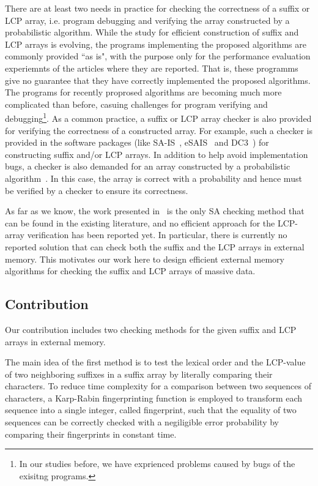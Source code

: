 \documentclass[10pt,journal,compsoc]{IEEEtran}
\begin{document}
{\color{red} There are at least two needs in practice for checking the correctness of a suffix or LCP array, i.e. program debugging and verifying the array constructed by a probabilistic algorithm.}
While the study for efficient construction of suffix and LCP arrays is evolving, the programs implementing the proposed algorithms are commonly provided ``as is", with the purpose only for the performance evaluation experiemnts of the articles where they are reported. That is, these programms give no guarantee that they have correctly implemented the proposed algorithms. The programs for recently proprosed algorithms are becoming much more complicated than before, casuing {\color{red} challenges} for program verifying and debugging\footnote{In our studies before, we have exprienced problems caused by bugs of the exisitng programs.}. As a common practice, a suffix or LCP array checker is also provided for verifying the correctness of a constructed array. For example, such a checker is provided in the software packages (like SA-IS~\cite{Nong11}, eSAIS~\cite{Bingmann12} and DC3~\cite{Dementiev08}) for constructing suffix and/or LCP arrays. In addition to help avoid implementation bugs, a checker is also demanded for an array constructed by a probabilistic algorithm~\cite{Bille2013}. In this case, the array is correct with a probability and hence must be verified by a checker to ensure its correctness.

As far as we know, the work presented in~\cite{Burkhardt2003} is the only SA checking method that can be found in the existing literature, and no efficient approach for the LCP-array verification has been reported yet. In particular, there is currently no reported solution that can check both the suffix and the LCP arrays in external memory. This motivates our work here to design efficient external memory algorithms for checking the suffix and LCP arrays of massive data.
	
\subsection{Contribution}\label{sec:introduction:contribution}

Our contribution includes two checking methods for the given suffix and LCP arrays in external memory.

The main idea of the first method is to test the lexical order and the LCP-value of two neighboring suffixes in a suffix array by literally comparing their characters. To reduce time complexity for a comparison between two sequences of characters, a Karp-Rabin fingerprinting function is employed to transform each sequence into a single integer, called fingerprint, such that the equality of two sequences can be correctly checked with a negiligible error probability by comparing their fingerprints in constant time.
\end{document}
